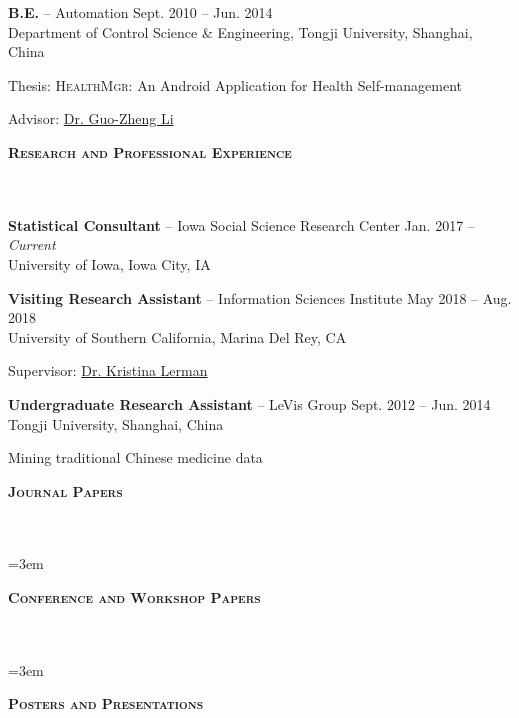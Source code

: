 \documentclass{article}
\newcommand{\header}[1]{{
\hspace*{-15pt}\vspace*{6pt} \textbf{\textsc{\large{#1}}}} \vspace*{-6pt} 
\lineunder
}
\newcommand{\lineunder}{
\vspace*{-8pt} \\ \hspace*{-15pt} 
\hrulefill \\
}
\newcommand{\employer}[4]{{
\vspace*{2pt}%
\textbf{#1} #2 \hfill #3\\ #4 \vspace*{2pt}}
}
\renewcommand{\labelitemii}{
$\vcenter{\hbox{\tiny$\bullet$}}$\hspace*{-3pt}
}
\newenvironment{bullet-list-minor}{
\begin{list}{\labelitemii}{\setlength\leftmargin{15pt} 
\topsep 0pt \itemsep -2pt}}{\vspace*{4pt}\end{list}
}
\begin{document}
    \employer{B.E.}{-- Automation}{Sept. 2010 -- Jun. 2014}{Department of Control Science \& Engineering, Tongji University, Shanghai, China}
	\begin{bullet-list-minor}
    	\item Thesis: \textsc{HealthMgr}: An Android Application for Health Self-management
        \item Advisor: \href{http://www.ndctcm.cn/gzli/}{Dr. Guo-Zheng Li}
    \end{bullet-list-minor}
    
\vspace*{4pt}
\header{Research and Professional Experience}
    \employer{Statistical Consultant}{-- Iowa Social Science Research Center}{Jan. 2017 -- \textit{Current}}{University of Iowa, Iowa City, IA}
    \vspace*{4pt}

    \employer{Visiting Research Assistant}{-- Information Sciences Institute}{May 2018 -- Aug. 2018}{University of Southern California, Marina Del Rey, CA}
	\begin{bullet-list-minor}
        \item Supervisor: \href{www.isi.edu/~lerman/}{Dr. Kristina Lerman}
    \end{bullet-list-minor}
    
    \employer{Undergraduate Research Assistant}{-- LeVis Group}{Sept. 2012 -- Jun. 2014}{Tongji University, Shanghai, China}
	\begin{bullet-list-minor}
        \item Mining traditional Chinese medicine data
    \end{bullet-list-minor}
    
    
\vspace*{4pt}%
\header{Journal Papers}

\nocite{*}
\newrefcontext[labelprefix=J]
\emergencystretch=3em
\printbibliography[heading=none,keyword={J}] 

\vspace*{4pt}%
\header{Conference and Workshop Papers}

\nocite{*}
\newrefcontext[labelprefix=C]
\emergencystretch=3em
\printbibliography[keyword={C},heading=none] 

\vspace*{4pt}%
\header{Posters and Presentations}
\end{document}
